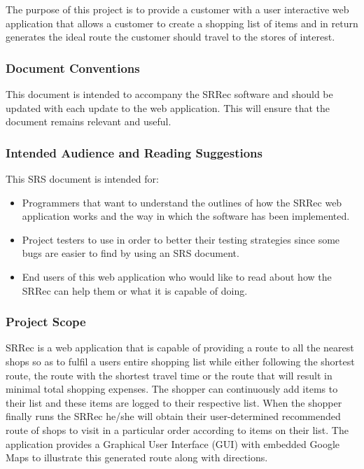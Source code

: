 \documentclass[10pt,twocolumn]{witseiepaper}
\begin{document}
			The purpose of this project is to provide a customer with a user interactive web application that allows a customer to create a shopping list of items and in return generates the ideal route the customer should travel to the stores of interest. 
		
		\subsubsection{Document Conventions}
		
			This document is intended to accompany the SRRec software and should be updated with each update to the web application. This will ensure that the document remains relevant and useful.
		
		\subsubsection{Intended Audience and Reading Suggestions}
		
			This SRS document is intended for:
			\begin{itemize}
				\item Programmers that want to understand the outlines of how the SRRec web application works and the way in which the software has been implemented.
				\item Project testers to use in order to better their testing strategies since some bugs are easier to find by using an SRS document.
				\item End users of this web application who would like to read about how the SRRec can help them or what it is capable of doing.
			\end{itemize}
		
		\subsubsection{Project Scope}
			
			SRRec is a web application that is capable of providing a route to all the nearest shops so as to fulfil a users entire shopping list while either following the shortest route, the route with the shortest travel time or the route that will result in minimal total shopping expenses. The shopper can continuously add items to their list and these items are logged to their respective list. When the shopper finally runs the SRRec he/she will obtain their user-determined recommended route of shops to visit in a particular order according to items on their list. The application provides a Graphical User Interface (GUI) with embedded Google Maps to illustrate this generated route along with directions. \\
			
\end{document}
